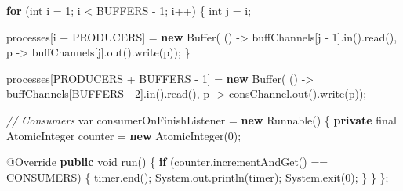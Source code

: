 \documentclass[11pt]{article}
\newenvironment{Shaded}{}{}
\newcommand{\KeywordTok}[1]{\textcolor[rgb]{0.00,0.44,0.13}{\textbf{{#1}}}}
\newcommand{\DataTypeTok}[1]{\textcolor[rgb]{0.56,0.13,0.00}{{#1}}}
\newcommand{\DecValTok}[1]{\textcolor[rgb]{0.25,0.63,0.44}{{#1}}}
\newcommand{\CommentTok}[1]{\textcolor[rgb]{0.38,0.63,0.69}{\textit{{#1}}}}
\newcommand{\FunctionTok}[1]{\textcolor[rgb]{0.02,0.16,0.49}{{#1}}}
\newcommand{\NormalTok}[1]{{#1}}
\newcommand{\ControlFlowTok}[1]{\textcolor[rgb]{0.00,0.44,0.13}{\textbf{{#1}}}}
\newcommand{\OperatorTok}[1]{\textcolor[rgb]{0.40,0.40,0.40}{{#1}}}
\newcommand{\BuiltInTok}[1]{{#1}}
\newcommand{\AttributeTok}[1]{\textcolor[rgb]{0.49,0.56,0.16}{{#1}}}
\begin{document}
\begin{Shaded}
\begin{Highlighting}[]
        \ControlFlowTok{for} \OperatorTok{(}\DataTypeTok{int}\NormalTok{ i }\OperatorTok{=} \DecValTok{1}\OperatorTok{;}\NormalTok{ i }\OperatorTok{\textless{}}\NormalTok{ BUFFERS }\OperatorTok{{-}} \DecValTok{1}\OperatorTok{;}\NormalTok{ i}\OperatorTok{++)} \OperatorTok{\{}
            \DataTypeTok{int}\NormalTok{ j }\OperatorTok{=}\NormalTok{ i}\OperatorTok{;}

\NormalTok{            processes}\OperatorTok{[}\NormalTok{i }\OperatorTok{+}\NormalTok{ PRODUCERS}\OperatorTok{]} \OperatorTok{=} \KeywordTok{new} \BuiltInTok{Buffer}\OperatorTok{(}
                    \OperatorTok{()} \OperatorTok{{-}\textgreater{}}\NormalTok{ buffChannels}\OperatorTok{[}\NormalTok{j }\OperatorTok{{-}} \DecValTok{1}\OperatorTok{].}\FunctionTok{in}\OperatorTok{().}\FunctionTok{read}\OperatorTok{(),}
\NormalTok{                    p }\OperatorTok{{-}\textgreater{}}\NormalTok{ buffChannels}\OperatorTok{[}\NormalTok{j}\OperatorTok{].}\FunctionTok{out}\OperatorTok{().}\FunctionTok{write}\OperatorTok{(}\NormalTok{p}\OperatorTok{));}
        \OperatorTok{\}}

\NormalTok{        processes}\OperatorTok{[}\NormalTok{PRODUCERS }\OperatorTok{+}\NormalTok{ BUFFERS }\OperatorTok{{-}} \DecValTok{1}\OperatorTok{]} \OperatorTok{=} \KeywordTok{new} \BuiltInTok{Buffer}\OperatorTok{(}
                \OperatorTok{()} \OperatorTok{{-}\textgreater{}}\NormalTok{ buffChannels}\OperatorTok{[}\NormalTok{BUFFERS }\OperatorTok{{-}} \DecValTok{2}\OperatorTok{].}\FunctionTok{in}\OperatorTok{().}\FunctionTok{read}\OperatorTok{(),}
\NormalTok{                p }\OperatorTok{{-}\textgreater{}}\NormalTok{ consChannel}\OperatorTok{.}\FunctionTok{out}\OperatorTok{().}\FunctionTok{write}\OperatorTok{(}\NormalTok{p}\OperatorTok{));}

        \CommentTok{// Consumers}
        \DataTypeTok{var}\NormalTok{ consumerOnFinishListener }\OperatorTok{=} \KeywordTok{new} \BuiltInTok{Runnable}\OperatorTok{()} \OperatorTok{\{}
            \KeywordTok{private} \DataTypeTok{final} \BuiltInTok{AtomicInteger}\NormalTok{ counter }\OperatorTok{=} \KeywordTok{new} \BuiltInTok{AtomicInteger}\OperatorTok{(}\DecValTok{0}\OperatorTok{);}

            \AttributeTok{@Override}
            \KeywordTok{public} \DataTypeTok{void} \FunctionTok{run}\OperatorTok{()} \OperatorTok{\{}
                \ControlFlowTok{if} \OperatorTok{(}\NormalTok{counter}\OperatorTok{.}\FunctionTok{incrementAndGet}\OperatorTok{()} \OperatorTok{==}\NormalTok{ CONSUMERS}\OperatorTok{)} \OperatorTok{\{}
\NormalTok{                    timer}\OperatorTok{.}\FunctionTok{end}\OperatorTok{();}
                    \BuiltInTok{System}\OperatorTok{.}\FunctionTok{out}\OperatorTok{.}\FunctionTok{println}\OperatorTok{(}\NormalTok{timer}\OperatorTok{);}
                    \BuiltInTok{System}\OperatorTok{.}\FunctionTok{exit}\OperatorTok{(}\DecValTok{0}\OperatorTok{);}
                \OperatorTok{\}}
            \OperatorTok{\}}
        \OperatorTok{\};}


\end{Highlighting}
\end{Shaded}
\end{document}
